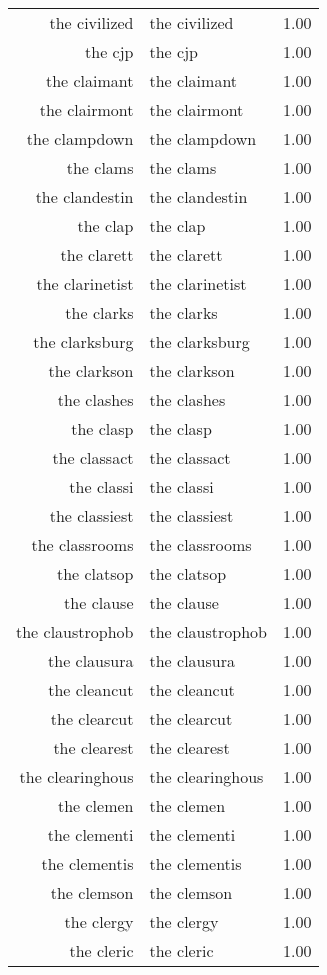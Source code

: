 \begin{table}[ht]
\begin{tabular}{rlr}
  the civilized & the civilized & 1.00 \\ 
  the cjp & the cjp & 1.00 \\ 
  the claimant & the claimant & 1.00 \\ 
  the clairmont & the clairmont & 1.00 \\ 
  the clampdown & the clampdown & 1.00 \\ 
  the clams & the clams & 1.00 \\ 
  the clandestin & the clandestin & 1.00 \\ 
  the clap & the clap & 1.00 \\ 
  the clarett & the clarett & 1.00 \\ 
  the clarinetist & the clarinetist & 1.00 \\ 
  the clarks & the clarks & 1.00 \\ 
  the clarksburg & the clarksburg & 1.00 \\ 
  the clarkson & the clarkson & 1.00 \\ 
  the clashes & the clashes & 1.00 \\ 
  the clasp & the clasp & 1.00 \\ 
  the classact & the classact & 1.00 \\ 
  the classi & the classi & 1.00 \\ 
  the classiest & the classiest & 1.00 \\ 
  the classrooms & the classrooms & 1.00 \\ 
  the clatsop & the clatsop & 1.00 \\ 
  the clause & the clause & 1.00 \\ 
  the claustrophob & the claustrophob & 1.00 \\ 
  the clausura & the clausura & 1.00 \\ 
  the cleancut & the cleancut & 1.00 \\ 
  the clearcut & the clearcut & 1.00 \\ 
  the clearest & the clearest & 1.00 \\ 
  the clearinghous & the clearinghous & 1.00 \\ 
  the clemen & the clemen & 1.00 \\ 
  the clementi & the clementi & 1.00 \\ 
  the clementis & the clementis & 1.00 \\ 
  the clemson & the clemson & 1.00 \\ 
  the clergy & the clergy & 1.00 \\ 
  the cleric & the cleric & 1.00 \\ 

\end{tabular}
\end{table}
